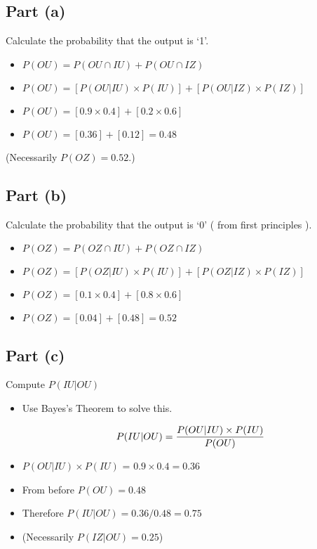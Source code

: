 \documentclass[a4paper,12pt]{article}
\begin{document}

\subsection*{Part (a)}
Calculate the probability that the output is `1'.
\begin{itemize}
\item $P(OU) = P(OU \cap IU) + P(OU \cap IZ)$

\item $P(OU) = [P(OU|IU) \times P(IU) ] + [P(OU|IZ) \times P(IZ) ]$

\item $P(OU) = [0.9 \times 0.4 ] + [0.2 \times 0.6 ]$

\item $P(OU) = [0.36] + [0.12] = \boldsymbol{0.48}$
\end{itemize}
(Necessarily $P(OZ) = 0.52$.)


\subsection*{Part (b)}
Calculate the probability that the output is `0' ( from first principles ).
\begin{itemize}
\item $P(OZ) = P(OZ \cap IU) + P(OZ \cap IZ)$

\item $P(OZ) = [P(OZ|IU) \times P(IU) ] + [P(OZ|IZ) \times P(IZ) ]$

\item $P(OZ) = [0.1 \times 0.4 ] + [0.8 \times 0.6 ]$

\item $P(OZ) = [0.04] + [0.48] = \boldsymbol{0.52}$
\end{itemize}


\subsection*{Part (c)}
Compute $P(IU|OU)$ 

\begin{itemize}
\item Use Bayes's Theorem to solve this.

\[P(IU|OU) = { P(OU|IU) \times P(IU)\over P(OU) } \]

\item $P(OU|IU)\times P(IU)$ = $0.9 \times 0.4 = 0.36$
\item From before $P(OU) = 0.48$
\item Therefore $P(IU|OU) = 0.36 / 0.48 = \boldsymbol{0.75}$
\item (Necessarily $P(IZ|OU)  = 0.25$)
\end{itemize}
\end{document}
